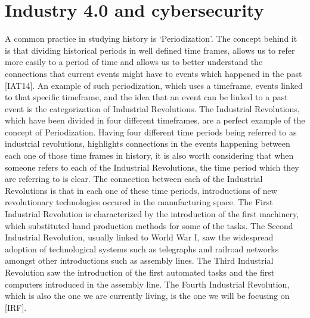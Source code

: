 \documentclass[a4paper, 12pt]{book}
\begin{document}
\chapter{Industry 4.0 and cybersecurity}
A common practice in studying history is ‘Periodization’. The concept behind it is that dividing historical periods in well defined time frames, allows us to refer more easily to a period of time and allows us to better understand the connections that current events might have to events which happened in the past [IAT14]. An example of such periodization, which uses a timeframe, events linked to that specific timeframe, and the idea that an event can be linked to a past event is the categorization of Industrial Revolutions.
The Industrial Revolutions, which have been divided in four different timeframes, are a  perfect example of the concept of Periodization. Having four different time periods being referred to as industrial revolutions, highlights connections in the events happening between each one of those time frames in history, it is also worth considering that when someone refers to each of the Industrial Revolutions, the time period which they are referring to is clear.
The connection between each of the Industrial Revolutions is that in each one of these time periods, introductions of new revolutionary technologies occured in the manufacturing space. The First Industrial Revolution is characterized by the introduction of the first machinery, which substituted hand production methods for some of the tasks. The Second Industrial Revolution, usually linked to World War I, saw the widespread adoption of technological systems such as telegraphs and railroad networks amongst other introductions such as assembly lines. The Third Industrial Revolution saw the introduction of the first automated tasks and the first computers introduced in the assembly line. The Fourth Industrial Revolution, which is also the one we are currently living, is the one we will be focusing on [IRF].
\end{document}
